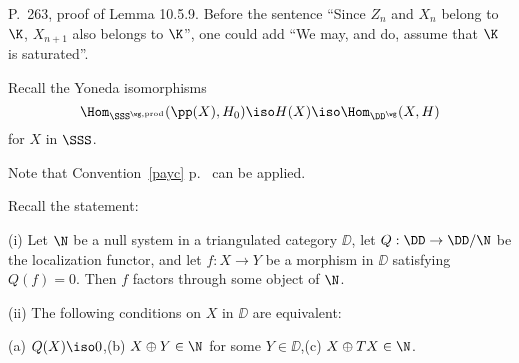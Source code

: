 \documentclass[12pt]{article}
\theoremstyle{remark}
\theoremstyle{definition}
\begin{document}

\begin{s} P.~263, proof of Lemma 10.5.9. Before the sentence ``Since $Z_n$ and $X_n$ belong to $\K$, $X_{n+1}$ also belongs to $\K$'', one could add ``We may, and do, assume that $\K$ is saturated''.

Recall the Yoneda isomorphisms 
$$
\Hom_{\SSS^{\wg,\text{prod}}}(\pp(X),H_0)\iso H(X)\iso\Hom_{\DD^\wg}(X,H)
$$ 
for $X$ in $\SSS$.

Note that Convention~\ref{payc} p.~ can be applied.
\end{s}



Recall the statement: 

\nn(i) Let $\N$ be a null system in a triangulated category $\DD$, let $Q:\DD\to\DD/\N$ be the localization functor, and let $f:X\to Y$ be a morphism in $\DD$ satisfying $Q(f)=0$. Then $f$ factors through some object of $\N$. 

\nn(ii) The following conditions on $X$ in $\DD$ are equivalent: 

\nn(a) $Q(X)\iso0$,\quad(b) $X\oplus Y\in\N$ for some $Y\in\DD$,\quad(c) $X\oplus TX\in\N$.
\end{document}
